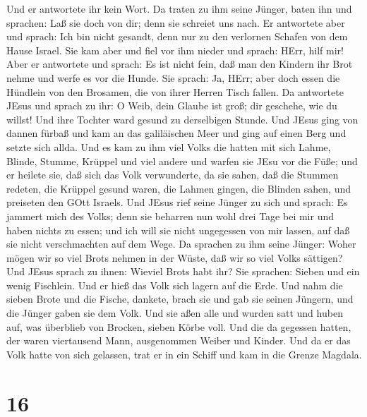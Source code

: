  Und er antwortete ihr kein Wort. Da traten zu ihm seine
Jünger, baten ihn und sprachen: Laß sie doch von dir; denn sie schreiet
uns nach.  Er antwortete aber und sprach: Ich bin nicht
gesandt, denn nur zu den verlornen Schafen von dem Hause Israel.
 Sie kam aber und fiel vor ihm nieder und sprach: HErr,
hilf mir!  Aber er antwortete und sprach: Es ist nicht
fein, daß man den Kindern ihr Brot nehme und werfe es vor die Hunde.
 Sie sprach: Ja, HErr; aber doch essen die Hündlein von den
Brosamen, die von ihrer Herren Tisch fallen.  Da antwortete
JEsus und sprach zu ihr: O Weib, dein Glaube ist groß; dir geschehe, wie
du willst! Und ihre Tochter ward gesund zu derselbigen Stunde.
 Und JEsus ging von dannen fürbaß und kam an das
galiläischen Meer und ging auf einen Berg und setzte sich allda.
 Und es kam zu ihm viel Volks die hatten mit sich Lahme,
Blinde, Stumme, Krüppel und viel andere und warfen sie JEsu vor die
Füße; und er heilete sie,  daß sich das Volk verwunderte,
da sie sahen, daß die Stummen redeten, die Krüppel gesund waren, die
Lahmen gingen, die Blinden sahen, und preiseten den GOtt Israels.
 Und JEsus rief seine Jünger zu sich und sprach: Es jammert
mich des Volks; denn sie beharren nun wohl drei Tage bei mir und haben
nichts zu essen; und ich will sie nicht ungegessen von mir lassen, auf
daß sie nicht verschmachten auf dem Wege.  Da sprachen zu
ihm seine Jünger: Woher mögen wir so viel Brots nehmen in der Wüste, daß
wir so viel Volks sättigen?  Und JEsus sprach zu ihnen:
Wieviel Brots habt ihr? Sie sprachen: Sieben und ein wenig Fischlein.
 Und er hieß das Volk sich lagern auf die Erde.
 Und nahm die sieben Brote und die Fische, dankete, brach
sie und gab sie seinen Jüngern, und die Jünger gaben sie dem Volk.
 Und sie aßen alle und wurden satt und huben auf, was
überblieb von Brocken, sieben Körbe voll.  Und die da
gegessen hatten, der waren viertausend Mann, ausgenommen Weiber und
Kinder.  Und da er das Volk hatte von sich gelassen, trat
er in ein Schiff und kam in die Grenze Magdala.

\hypertarget{section-15}{%
\section{16}\label{section-15}}

